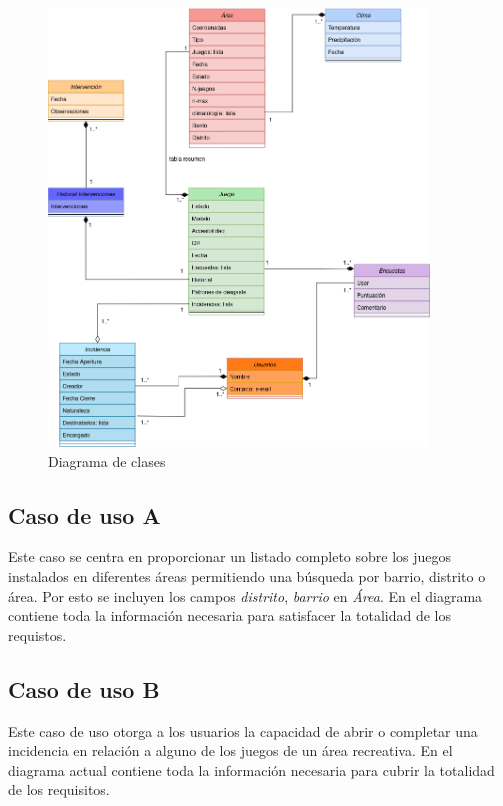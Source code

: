 \documentclass[]{article}
\begin{document}
\begin{figure}[H]
    \centering
    \includegraphics[width=0.9\textwidth]{diagrama_arqui-noaggregados.png}
    \caption{\small Diagrama de clases}
\end{figure}

\subsection{Caso de uso A}
\label{subsec:casoA}
Este caso se centra en proporcionar un listado completo sobre los juegos instalados en diferentes áreas permitiendo una búsqueda por barrio, distrito o área. Por esto se incluyen los campos \textit{distrito}, \textit{barrio} en \textit{Área}. En el diagrama contiene toda la información necesaria para satisfacer la totalidad de los requistos.

\subsection{Caso de uso B}
\label{subsec:casoB}
Este caso de uso otorga a los usuarios la capacidad de abrir o completar una incidencia en relación a alguno de los juegos de un área recreativa. En el diagrama actual contiene toda la información necesaria para cubrir la totalidad de los requisitos.
\end{document}
